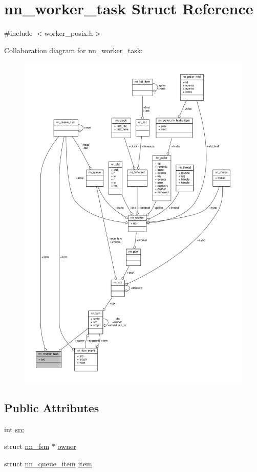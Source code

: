 \hypertarget{structnn__worker__task}{}\section{nn\+\_\+worker\+\_\+task Struct Reference}
\label{structnn__worker__task}


{\ttfamily \#include $<$worker\+\_\+posix.\+h$>$}



Collaboration diagram for nn\+\_\+worker\+\_\+task\+:\nopagebreak
\begin{figure}[H]
\begin{center}
\leavevmode
\includegraphics[width=350pt]{structnn__worker__task__coll__graph}
\end{center}
\end{figure}
\subsection*{Public Attributes}
\begin{DoxyCompactItemize}
\item 
int \hyperlink{structnn__worker__task_a4156adeadc92ae737bf02d525699b642}{src}
\item 
struct \hyperlink{structnn__fsm}{nn\+\_\+fsm} $\ast$ \hyperlink{structnn__worker__task_af9d121f46294915e9613f9c10a87388a}{owner}
\item 
struct \hyperlink{structnn__queue__item}{nn\+\_\+queue\+\_\+item} \hyperlink{structnn__worker__task_aada79ededec6bb2e9ff44ecf0fd44e85}{item}
\end{DoxyCompactItemize}



